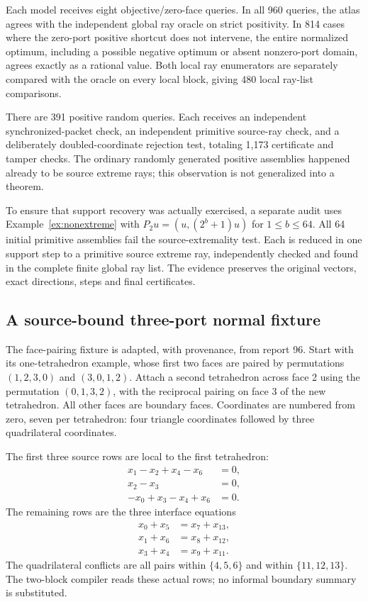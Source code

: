 Each model receives eight objective/zero-face queries. In all 960 queries, the atlas agrees with the independent global ray oracle on strict positivity. In 814 cases where the zero-port positive shortcut does not intervene, the entire normalized optimum, including a possible negative optimum or absent nonzero-port domain, agrees exactly as a rational value. Both local ray enumerators are separately compared with the oracle on every local block, giving 480 local ray-list comparisons.

There are 391 positive random queries. Each receives an independent synchronized-packet check, an independent primitive source-ray check, and a deliberately doubled-coordinate rejection test, totaling 1,173 certificate and tamper checks. The ordinary randomly generated positive assemblies happened already to be source extreme rays; this observation is not generalized into a theorem.

To ensure that support recovery was actually exercised, a separate audit uses Example~\ref{ex:nonextreme} with $P_2u=(u,(2^b+1)u)$ for $1\le b\le64$. All 64 initial primitive assemblies fail the source-extremality test. Each is reduced in one support step to a primitive source extreme ray, independently checked and found in the complete finite global ray list. The evidence preserves the original vectors, exact directions, steps and final certificates.

\subsection{A source-bound three-port normal fixture}
The face-pairing fixture is adapted, with provenance, from report 96. Start with its one-tetrahedron example, whose first two faces are paired by permutations $(1,2,3,0)$ and $(3,0,1,2)$. Attach a second tetrahedron across face 2 using the permutation $(0,1,3,2)$, with the reciprocal pairing on face 3 of the new tetrahedron. All other faces are boundary faces. Coordinates are numbered from zero, seven per tetrahedron: four triangle coordinates followed by three quadrilateral coordinates.

The first three source rows are local to the first tetrahedron:
\begin{align*}
 x_1-x_2+x_4-x_6&=0,\\
 x_2-x_3&=0,\\
 -x_0+x_3-x_4+x_6&=0.
\end{align*}
The remaining rows are the three interface equations
\begin{align}
 x_0+x_5&=x_7+x_{13},\nonumber\\
 x_1+x_6&=x_8+x_{12},\label{eq:fixture-ports}\\
 x_3+x_4&=x_9+x_{11}.\nonumber
\end{align}
The quadrilateral conflicts are all pairs within $\{4,5,6\}$ and within $\{11,12,13\}$. The two-block compiler reads these actual rows; no informal boundary summary is substituted.

